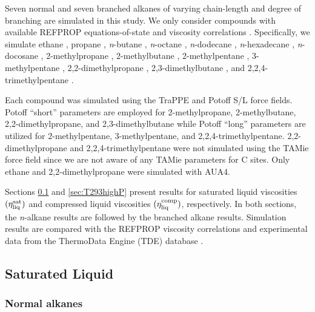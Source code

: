 \documentclass[preprint,review,12pt]{elsarticle}
\begin{document}
	Seven normal and seven branched alkanes of varying chain-length and degree of branching are simulated in this study. We only consider compounds with available REFPROP equations-of-state and viscosity correlations \cite{LEMMON-RP91}. Specifically, we simulate ethane \cite{Ethane2006,Vogel2015}, propane \cite{Propane2009,Vogel2016}, \textit{n}-butane \cite{Butane2006,Hermann2018}, \textit{n}-octane \cite{Beckmueller2017,Huber2004FPE}, \textit{n}-dodecane \cite{Lemmon2004,Huber2004}, \textit{n}-hexadecane \cite{Romeo2018,Vesovic2017}, \textit{n}-docosane \cite{Romeo2018,Huber2018}, 2-methylpropane \cite{Lemmon2006,Vogel2000}, 2-methylbutane \cite{Lemmon2006,Huber2018}, 2-methylpentane \cite{Lemmon2006,Huber2018}, 3-methylpentane \cite{Gao2017,Huber2018}, 2,2-dimethylpropane \cite{Lemmon2006,Huber2018}, 2,3-dimethylbutane \cite{Gao2017,Huber2018}, and 2,2,4-trimethylpentane \cite{Blackham2017,Huber2018}. 
	
	Each compound was simulated using the TraPPE and Potoff S/L force fields. Potoff ``short'' parameters are employed for 2-methylpropane, 2-methylbutane, 2,2-dimethylpropane, and 2,3-dimethylbutane while Potoff ``long'' parameters are utilized for 2-methylpentane, 3-methylpentane, and 2,2,4-trimethylpentane. 2,2-dimethylpropane and 2,2,4-trimethylpentane were not simulated using the TAMie force field since we are not aware of any TAMie parameters for C sites. Only ethane and 2,2-dimethylpropane were simulated with AUA4. 
	
	Sections \ref{sec:eta_sat} and \ref{sec:T293highP} present results for saturated liquid viscosities $(\eta_{\rm liq}^{\rm sat})$ and compressed liquid viscosities $(\eta_{\rm liq}^{\rm comp})$, respectively. In both sections, the \textit{n}-alkane results are followed by the branched alkane results. Simulation results are compared with the REFPROP viscosity correlations and experimental data from the ThermoData Engine (TDE) database \cite{TDE}.
	
	\subsection{Saturated Liquid} \label{sec:eta_sat}
	
	\subsubsection{Normal alkanes}
	
	
\end{document}
